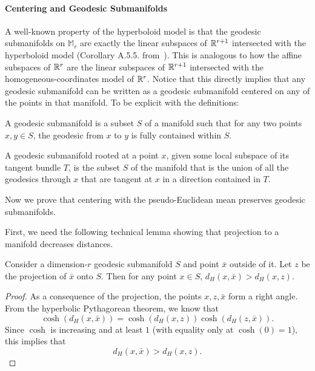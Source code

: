 \paragraph*{Centering and Geodesic Submanifolds}
A well-known property of the hyperboloid model is that the geodesic submanifolds on $\mathbb{M}_r$ are exactly the linear subspaces of $\mathbb{R}^{r+1}$ intersected with the hyperboloid model (Corollary A.5.5. from~\cite{Benedetti}).
This is analogous to how the affine subspaces of $\mathbb{R}^r$ are the linear subspaces of $\mathbb{R}^{r+1}$ intersected with the homogeneous-coordinates model of $\mathbb{R}^r$.
Notice that this directly implies that any geodesic submanifold can be written as a geodesic submanifold centered on any of the points in that manifold.
To be explicit with the definitions:
\begin{definition}
A geodesic submanifold is a subset $S$ of a manifold such that for any two points $x, y \in S$, the geodesic from $x$ to $y$ is fully contained within $S$.
\end{definition}

\begin{definition}
A geodesic submanifold rooted at a point $x$, given some local subspace of its tangent bundle $T$, is the subset $S$ of the manifold that is the union of all the geodesics through $x$ that are tangent at $x$ in a direction contained in $T$.
\end{definition}

Now we prove that centering with the pseudo-Euclidean mean preserves geodesic submanifolds.

First, we need the following technical lemma showing that projection to a manifold decreases distances.
\begin{lemma}
  \label{lmm:manifold-projection}
  Consider a dimension-$r$ geodesic submanifold $S$ and point $\bar x$ outside of it.
  Let $z$ be the projection of $\bar x$ onto $S$.
  Then for any point $x \in S$, $d_H(x, \bar x) > d_H(x, z)$.
\end{lemma}
\begin{proof}
  As a consequence of the projection, the points $x, z, \bar x$ form a right angle.
  From the hyperbolic Pythagorean theorem, we know that
  \[
    \cosh(d_H(x, \bar x)) = \cosh(d_H(x, z)) \cosh(d_H(z, \bar x)).
  \]
  Since $\cosh$ is increasing and at least $1$ (with equality only at $\cosh(0) = 1$), this implies that
  \[
    d_H(x, \bar x) > d_H(x, z).
  \]
\end{proof}

